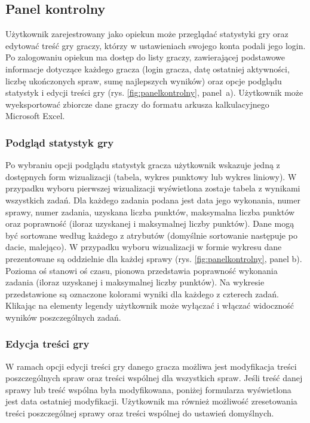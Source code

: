     \subsection{Panel kontrolny}
        Użytkownik zarejestrowany jako opiekun może przeglądać statystyki gry oraz edytować treść gry graczy, którzy w ustawieniach swojego konta podali jego login.
        Po zalogowaniu opiekun ma dostęp do listy graczy, zawierającej podstawowe informacje dotyczące każdego gracza (login gracza, datę ostatniej aktywności, liczbę ukończonych spraw, sumę najlepszych wyników) oraz opcje podglądu statystyk i edycji treści gry (rys. \ref{fig:panelkontrolny}, panel~a).
        Użytkownik może wyeksportować zbiorcze dane graczy do formatu arkusza kalkulacyjnego Microsoft Excel.
        
        \subsubsection{Podgląd statystyk gry}
        Po wybraniu opcji podglądu statystyk gracza użytkownik wskazuje jedną z dostępnych form wizualizacji (tabela, wykres punktowy lub wykres liniowy).
        W przypadku wyboru pierwszej wizualizacji wyświetlona zostaje tabela z wynikami wszystkich zadań.
        Dla każdego zadania podana jest data jego wykonania, numer sprawy, numer zadania, uzyskana liczba punktów, maksymalna liczba punktów oraz poprawność (iloraz uzyskanej i maksymalnej liczby punktów).
        Dane mogą być sortowane według każdego z atrybutów (domyślnie sortowanie następuje po dacie, malejąco).
        W przypadku wyboru wizualizacji w formie wykresu dane prezentowane są oddzielnie dla każdej sprawy (rys. \ref{fig:panelkontrolny}, panel b).
        Pozioma oś stanowi oś czasu, pionowa przedstawia poprawność wykonania zadania (iloraz uzyskanej i maksymalnej liczby punktów).
        Na wykresie przedstawione są oznaczone kolorami wyniki dla każdego z czterech zadań.
        Klikając na elementy legendy użytkownik może wyłączać i włączać widoczność wyników poszczególnych zadań.
        
        \subsubsection{Edycja treści gry}
        W ramach opcji edycji treści gry danego gracza możliwa jest modyfikacja treści poszczególnych spraw oraz treści wspólnej dla wszystkich spraw. Jeśli treść danej sprawy lub treść wspólna była modyfikowana, poniżej formularza wyświetlona jest data ostatniej modyfikacji.
        Użytkownik ma również możliwość zresetowania treści poszczególnej sprawy oraz treści wspólnej do ustawień domyślnych.

